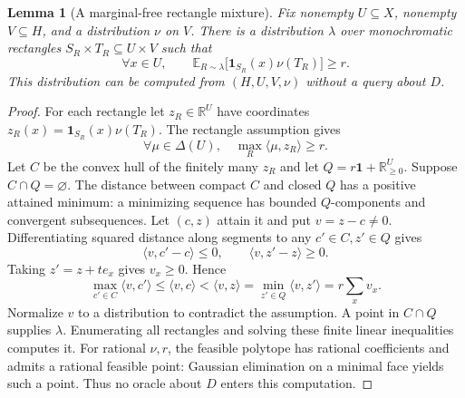 \documentclass[11pt]{article}
\newtheorem{lemma}[theorem]{Lemma}
\newcommand{\R}{\mathbb R}
\newcommand{\E}{\mathbb E}
\newcommand{\1}{\mathbf 1}
\begin{document}
\begin{lemma}[A marginal-free rectangle mixture]\label{lem:mixture}
Fix nonempty $U\subseteq X$, nonempty $V\subseteq H$, and a distribution $\nu$ on $V$. There is a distribution $\lambda$ over monochromatic rectangles $S_R\times T_R\subseteq U\times V$ such that
\begin{equation}\label{eq:coverage}
 \forall x\in U,\qquad
 \E_{R\sim\lambda}\bigl[\1_{S_R}(x)\nu(T_R)\bigr]\ge r.
\end{equation}
This distribution can be computed from $(H,U,V,\nu)$ without a query about $D$.
\end{lemma}
\begin{proof}
For each rectangle let $z_R\in\R^U$ have coordinates $z_R(x)=\1_{S_R}(x)\nu(T_R)$. The rectangle assumption gives
\[
 \forall\mu\in\Delta(U),\quad \max_R\langle\mu,z_R\rangle\ge r.
\]
Let $C$ be the convex hull of the finitely many $z_R$ and let $Q=r\1+\R_{\ge0}^U$. Suppose $C\cap Q=\varnothing$. The distance between compact $C$ and closed $Q$ has a positive attained minimum: a minimizing sequence has bounded $Q$-components and convergent subsequences. Let $(c,z)$ attain it and put $v=z-c\ne0$. Differentiating squared distance along segments to any $c'\in C,z'\in Q$ gives
\[
 \langle v,c'-c\rangle\le0,\qquad\langle v,z'-z\rangle\ge0.
\]
Taking $z'=z+te_x$ gives $v_x\ge0$. Hence
\[
 \max_{c'\in C}\langle v,c'\rangle
 \le\langle v,c\rangle<\langle v,z\rangle
 =\min_{z'\in Q}\langle v,z'\rangle=r\sum_xv_x.
\]
Normalize $v$ to a distribution to contradict the assumption. A point in $C\cap Q$ supplies $\lambda$. Enumerating all rectangles and solving these finite linear inequalities computes it. For rational $\nu,r$, the feasible polytope has rational coefficients and admits a rational feasible point: Gaussian elimination on a minimal face yields such a point. Thus no oracle about $D$ enters this computation.
\end{proof}
\end{document}
